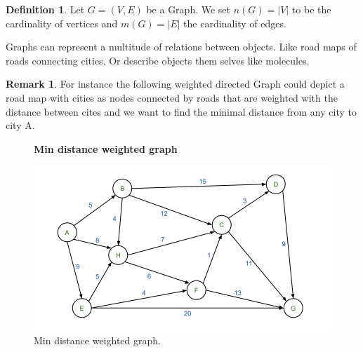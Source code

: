 \documentclass{article}
\theoremstyle{definition}
\newtheorem{definition}[theorem]{Definition}
\newtheorem{example}[theorem]{Remark}
\newcommand*{\figuretitle}[1]{%
    {\centering%
    \textbf{#1}%
    \par\medskip}%
}
\begin{document}
\begin{definition}
Let $G = (V, E)$ be a Graph. We set $n(G) = |V|$ to be the cardinality of vertices and $m(G) = |E|$ the cardinality of edges.
\end{definition}

Graphs can represent a multitude of relations between objects. Like road maps of roads connecting cities. Or describe objects them selves like molecules.

\begin{example}
For instance the following weighted directed Graph could depict a road map with cities as nodes connected by roads that are weighted with the distance between cites and we want to find the minimal distance from any city to city A. \

\begin{figure}[H]
\centering
\figuretitle{Min distance weighted graph}
\includegraphics[scale=0.5]{graphics/weighted_directed_graph_2.png}
\caption{Min distance weighted graph.}
\label{fig:neuron}
\end{figure}


\end{example}
\end{document}
